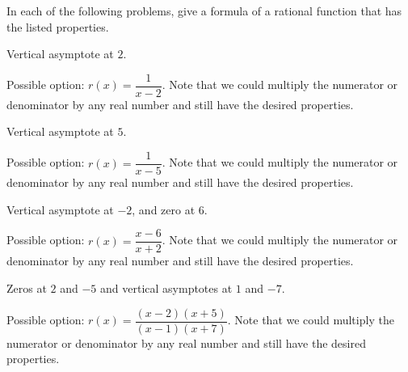 \begin{exercises}
	 \begin{problem}
	 In each of the following problems, give a formula of a rational
	 function that has the listed properties.
	 \begin{subproblem}
		 Vertical asymptote at $2$.
		 \begin{shortsolution}
			 Possible option: $r(x)=\dfrac{1}{x-2}$. Note that we could multiply the
			 numerator or denominator by any real number and still have the desired properties.
		 \end{shortsolution}
	 \end{subproblem}
	 \begin{subproblem}
		 Vertical asymptote at $5$.
		 \begin{shortsolution}
			 Possible option: $r(x)=\dfrac{1}{x-5}$. Note that we could multiply the
			 numerator or denominator by any real number and still have the desired properties.
		 \end{shortsolution}
	 \end{subproblem}
	 \begin{subproblem}
		 Vertical asymptote at $-2$, and zero at $6$.
		 \begin{shortsolution}
			 Possible option: $r(x)=\dfrac{x-6}{x+2}$. Note that we could multiply the
			 numerator or denominator by any real number and still have the desired properties.
		 \end{shortsolution}
	 \end{subproblem}
	 \begin{subproblem}
		 Zeros at $2$ and $-5$ and vertical asymptotes at $1$ and $-7$.
		 \begin{shortsolution}
			 Possible option: $r(x)=\dfrac{(x-2)(x+5)}{(x-1)(x+7)}$. Note that we could multiply the
			 numerator or denominator by any real number and still have the desired properties.
		 \end{shortsolution}
	 \end{subproblem}
	 \end{problem}


\end{exercises}
